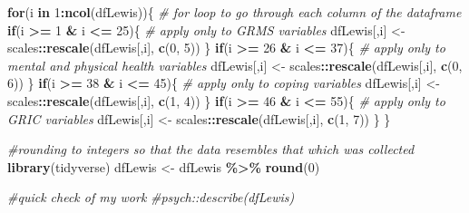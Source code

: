 \documentclass[
  11pt,
]{book}
\newenvironment{Shaded}{\begin{snugshade}}{\end{snugshade}}
\newcommand{\CommentTok}[1]{\textcolor[rgb]{0.37,0.37,0.37}{\textit{#1}}}
\newcommand{\ControlFlowTok}[1]{\textcolor[rgb]{0.27,0.27,0.27}{\textbf{#1}}}
\newcommand{\DecValTok}[1]{\textcolor[rgb]{0.06,0.06,0.06}{#1}}
\newcommand{\FunctionTok}[1]{\textcolor[rgb]{0.27,0.27,0.27}{\textbf{#1}}}
\newcommand{\NormalTok}[1]{#1}
\newcommand{\OtherTok}[1]{\textcolor[rgb]{0.37,0.37,0.37}{#1}}
\newcommand{\SpecialCharTok}[1]{\textcolor[rgb]{0.43,0.43,0.43}{\textbf{#1}}}
\begin{document}
\begin{Shaded}
\begin{Highlighting}[]
\ControlFlowTok{for}\NormalTok{(i }\ControlFlowTok{in} \DecValTok{1}\SpecialCharTok{:}\FunctionTok{ncol}\NormalTok{(dfLewis))\{  }\CommentTok{\# for loop to go through each column of the dataframe }
  \ControlFlowTok{if}\NormalTok{(i }\SpecialCharTok{\textgreater{}=} \DecValTok{1} \SpecialCharTok{\&}\NormalTok{ i }\SpecialCharTok{\textless{}=} \DecValTok{25}\NormalTok{)\{   }\CommentTok{\# apply only to GRMS variables}
\NormalTok{    dfLewis[,i] }\OtherTok{\textless{}{-}}\NormalTok{ scales}\SpecialCharTok{::}\FunctionTok{rescale}\NormalTok{(dfLewis[,i], }\FunctionTok{c}\NormalTok{(}\DecValTok{0}\NormalTok{, }\DecValTok{5}\NormalTok{))}
\NormalTok{  \}}
  \ControlFlowTok{if}\NormalTok{(i }\SpecialCharTok{\textgreater{}=} \DecValTok{26} \SpecialCharTok{\&}\NormalTok{ i }\SpecialCharTok{\textless{}=} \DecValTok{37}\NormalTok{)\{   }\CommentTok{\# apply only to mental and physical health variables }
\NormalTok{    dfLewis[,i] }\OtherTok{\textless{}{-}}\NormalTok{ scales}\SpecialCharTok{::}\FunctionTok{rescale}\NormalTok{(dfLewis[,i], }\FunctionTok{c}\NormalTok{(}\DecValTok{0}\NormalTok{, }\DecValTok{6}\NormalTok{))}
\NormalTok{  \}}
  \ControlFlowTok{if}\NormalTok{(i }\SpecialCharTok{\textgreater{}=} \DecValTok{38} \SpecialCharTok{\&}\NormalTok{ i }\SpecialCharTok{\textless{}=} \DecValTok{45}\NormalTok{)\{   }\CommentTok{\# apply only to coping variables}
\NormalTok{    dfLewis[,i] }\OtherTok{\textless{}{-}}\NormalTok{ scales}\SpecialCharTok{::}\FunctionTok{rescale}\NormalTok{(dfLewis[,i], }\FunctionTok{c}\NormalTok{(}\DecValTok{1}\NormalTok{, }\DecValTok{4}\NormalTok{))}
\NormalTok{  \}}
  \ControlFlowTok{if}\NormalTok{(i }\SpecialCharTok{\textgreater{}=} \DecValTok{46} \SpecialCharTok{\&}\NormalTok{ i }\SpecialCharTok{\textless{}=} \DecValTok{55}\NormalTok{)\{   }\CommentTok{\# apply only to GRIC variables}
\NormalTok{    dfLewis[,i] }\OtherTok{\textless{}{-}}\NormalTok{ scales}\SpecialCharTok{::}\FunctionTok{rescale}\NormalTok{(dfLewis[,i], }\FunctionTok{c}\NormalTok{(}\DecValTok{1}\NormalTok{, }\DecValTok{7}\NormalTok{))}
\NormalTok{  \}}
\NormalTok{\}}

\CommentTok{\#rounding to integers so that the data resembles that which was collected}
\FunctionTok{library}\NormalTok{(tidyverse)}
\NormalTok{dfLewis }\OtherTok{\textless{}{-}}\NormalTok{ dfLewis }\SpecialCharTok{\%\textgreater{}\%} \FunctionTok{round}\NormalTok{(}\DecValTok{0}\NormalTok{) }

\CommentTok{\#quick check of my work}
\CommentTok{\#psych::describe(dfLewis) }
\end{Highlighting}
\end{Shaded}
\end{document}
